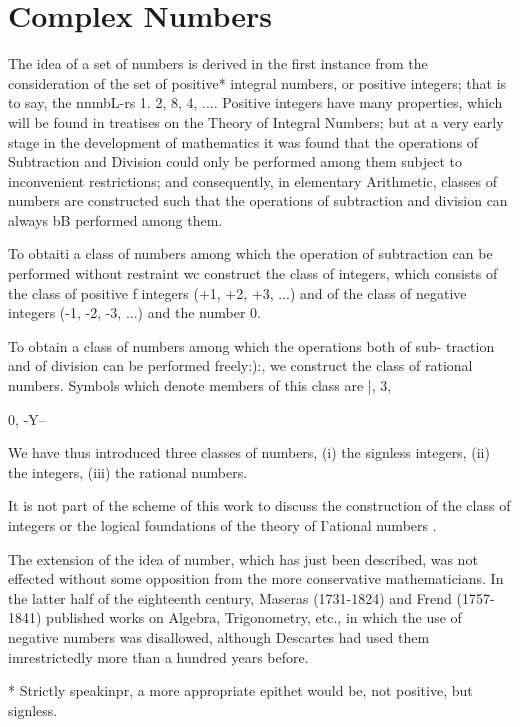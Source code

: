 \chapter{Complex Numbers}


The idea of a set of numbers is derived in the first instance from the
consideration of the set of positive* integral numbers, or positive
integers; that is to say, the nnmbL-rs 1. 2, 8, 4, .... Positive
integers have many properties, which will be found in treatises on the
Theory of Integral Numbers; but at a very early stage in the
development of mathematics it was found that the operations of
Subtraction and Division could only be performed among them subject to
inconvenient restrictions; and consequently, in elementary
Arithmetic, classes of numbers are constructed such that the
operations of subtraction and division can always bB performed among
them.

To obtaiti a class of numbers among which the operation of subtraction
can be performed without restraint wc construct the class of integers,
which consists of the class of positive f integers (+1, +2, +3, ...)
and of the class of negative integers (-1, -2, -3, ...) and the number
0.

To obtain a class of numbers among which the operations both of sub-
traction and of division can be performed freely:):, we construct the
class of rational numbers. Symbols which denote members of this class
are |, 3,

0, -Y--

We have thus introduced three classes of numbers, (i) the signless
integers, (ii) the integers, (iii) the rational numbers.

It is not part of the scheme of this work to discuss the construction
of the class of integers or the logical foundations of the theory of
I'ational numbers .

The extension of the idea of number, which has just been described,
was not effected without some opposition from the more conservative
mathematicians. In the latter half of the eighteenth century, Maseras
(1731-1824) and Frend (1757-1841) published works on Algebra,
Trigonometry, etc., in which the use of negative numbers was
disallowed, although Descartes had used them imrestrictedly more than
a hundred years before.

* Strictly speakinpr, a more appropriate epithet would be, not
positive, but signless.

